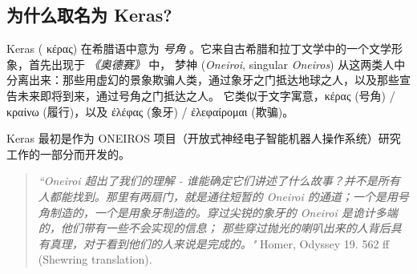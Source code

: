 \subsection{为什么取名为
Keras?}\label{ux4e3aux4ec0ux4e48ux53d6ux540dux4e3a-keras}

Keras (\setmainfont{Linux Libertine O} κέρας) 在希腊语中意为 \emph{号角}
。它来自古希腊和拉丁文学中的一个文学形象，首先出现于 \emph{《奥德赛》}
中， 梦神 (\emph{Oneiroi}, singular \emph{Oneiros})
从这两类人中分离出来：那些用虚幻的景象欺骗人类，通过象牙之门抵达地球之人，以及那些宣告未来即将到来，通过号角之门抵达之人。
它类似于文字寓意，{\setmainfont{Linux Libertine O}κέρας }(号角) / \setmainfont{Linux Libertine O}κραίνω (履行)，以及 \setmainfont{Linux Libertine O}ἐλέφας (象牙) /
\setmainfont{Linux Libertine O}ἐλεφαίρομαι (欺骗)。

Keras 最初是作为 ONEIROS
项目（开放式神经电子智能机器人操作系统）研究工作的一部分而开发的。

\begin{quote}
\emph{``Oneiroi 超出了我们的理解 -
谁能确定它们讲述了什么故事？并不是所有人都能找到。那里有两扇门，就是通往短暂的
Oneiroi 的通道；一个是用号角制造的，一个是用象牙制造的。穿过尖锐的象牙的
Oneiroi 是诡计多端的，他们带有一些不会实现的信息；
那些穿过抛光的喇叭出来的人背后具有真理，对于看到他们的人来说是完成的。"}
Homer, Odyssey 19. 562 ff (Shewring translation).
\end{quote}

\newpage
